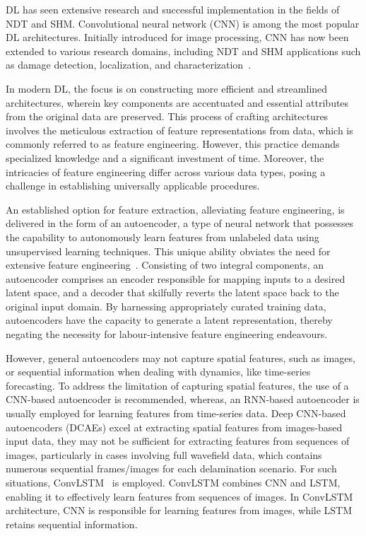 \documentclass[sn-mathphys-num]{sn-jnl}%
\begin{document}
	DL has seen extensive research and successful implementation in the fields 
	of NDT and SHM. 
	Convolutional neural network (CNN) is among the most popular DL 
	architectures. 
	Initially introduced for image processing, CNN has now been extended to 
	various research domains, including NDT and SHM applications such as damage 
	detection, localization, and characterization~\cite{rautela2019deep, 
	pandey2022explainable, ijjeh2021full, ijjeh2022deep}.
	
	In modern DL, the focus is on constructing more efficient and streamlined 
	architectures, wherein key components are accentuated and essential 
	attributes from the original data are preserved. 
	This process of crafting architectures involves the meticulous extraction 
	of feature representations from data, which is commonly referred to as 
	feature engineering. 
	However, this practice demands specialized knowledge and a significant 
	investment of time. 
	Moreover, the intricacies of feature engineering differ across various data 
	types, posing a challenge in establishing universally applicable procedures.
	
	An established option for feature extraction, alleviating feature 
	engineering, 
	is delivered in the form of an autoencoder, a type of neural network that 
	possesses the capability to autonomously learn features from unlabeled data 
	using unsupervised learning techniques. 
	This unique ability obviates the need for extensive feature 
	engineering~\cite{pinaya2020autoencoders, ardelean2023study, 
		simpson2021machine}. 
	Consisting of two integral components, an autoencoder comprises an encoder 
	responsible for mapping inputs to a desired latent space, and a decoder 
	that skilfully reverts the latent space back to the original input domain. 
	By harnessing appropriately curated training data, autoencoders have the 
	capacity to generate a latent representation, thereby negating the 
	necessity for labour-intensive feature engineering endeavours.
	
	However, general autoencoders may not capture spatial features, such as 
	images, or sequential information when dealing with dynamics, like 
	time-series forecasting. 
	To address the limitation of capturing spatial features, the use of a 
	CNN-based autoencoder is recommended, whereas, an RNN-based autoencoder is 
	usually employed for learning features from time-series data.
	Deep CNN-based autoencoders (DCAEs) excel at extracting spatial features 
	from images-based input data, they may not be sufficient for extracting 
	features from sequences of images, particularly in cases involving full 
	wavefield data, which contains numerous sequential frames/images for each 
	delamination scenario. 
	For such situations, ConvLSTM~\cite{shi2015convolutional} is employed. 
	ConvLSTM combines CNN and LSTM, enabling it to effectively learn features 
	from sequences of images. 
	In ConvLSTM architecture, CNN is responsible for learning features from 
	images, while LSTM retains sequential information.
	
\end{document}
